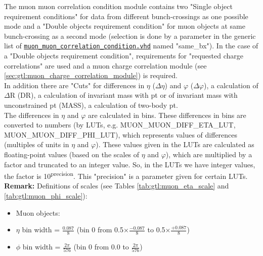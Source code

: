 The muon muon correlation condition module contains two "Single object requirement conditions" for data from different bunch-crossings as one possible mode
and a "Double objects requirement condition" for muon objects at same bunch-crossing as a second mode (selection is done by a parameter in the generic list of \href{https://github.com/cms-l1-globaltrigger/mp7_ugt_legacy/tree/master/firmware/hdl/gt_mp7_core/gtl_fdl_wrapper/gtl/muon_muon_correlation_condition.vhd}{\texttt{muon\_muon\_correlation\_condition.vhd}} named "same\_bx"). In the case of a "Double objects requirement condition", requirements for "requested charge correlations" are used and a muon charge correlation module (see \ref{sec:gtl:muon_charge_correlation_module}) is required.\\
In addition there are "Cuts" for differences in $\eta$ ($\Delta\eta$) and $\varphi$ ($\Delta\varphi$), a calculation of $\Delta$R (DR), a calculation of invariant mass with pt or of invariant mass with unconstrained pt (MASS), a calculation of two-body pt.\\
The differences in $\eta$ and $\varphi$ are calculated in bins. These differences in bins are converted to numbers (by LUTs, e.g. \small{MUON\_MUON\_DIFF\_ETA\_LUT, MUON\_MUON\_DIFF\_PHI\_LUT}\normalsize), which represents values of differences (multiples of units in $\eta$ and $\varphi$).
These values given in the LUTs are calculated as floating-point values (based on the scales of $\eta$ and $\varphi$), which are multiplied by a factor and truncated to an integer value.
So, in the LUTs we have integer values, the factor is 10\textsuperscript{\tiny{precision}\normalsize}. This "precision" is a parameter given for certain LUTs.\\

\textbf{Remark:} Definitions of scales (see Tables \ref{tab:gtl:muon_eta_scale} and \ref{tab:gtl:muon_phi_scale}):
\begin{itemize}
\item Muon objects:
\item $\eta$ bin width = $\frac{0.087}{8}$ (bin 0 from \small{0.5}$\times\frac{-0.087}{8}$ to \small{0.5}$\times\frac{+0.087}{8}$)
\item $\phi$ bin width = $\frac{2\pi}{576}$ (bin 0 from 0.0 to $\frac{2\pi}{576}$)
\end{itemize}

